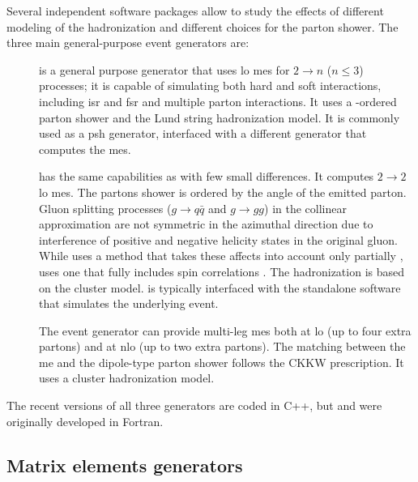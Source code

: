 Several independent software packages allow to study the effects of different modeling of the hadronization and different choices for the parton shower. The three main general-purpose event generators are:

\begin{description}
\item[\PY] \cite{Sjostrand:2006za,Sjostrand:2014zea} is a general purpose generator that uses \gls{lo} \glspl{me} for $2\rightarrow n $ ($n \leq 3$) processes; 
it is capable of simulating both hard and soft interactions, including \gls{isr} and \gls{fsr} and multiple parton interactions.
It uses a \pt-ordered parton shower and the Lund string hadronization model. It is commonly used as a \gls{psh} generator, interfaced with a different generator that computes the \glspl{me}.

\item[\HW] \cite{Corcella:2000bw,Bahr:2008pv,Bellm:2015jjp} has the same capabilities as \PY with few small differences. 
It computes $2\rightarrow 2$ \gls{lo} \glspl{me}.
 The partons shower is ordered by the angle of the emitted parton. Gluon splitting processes ($g \rightarrow q\bar{q}$ and $g \rightarrow gg$) in the collinear approximation are not symmetric in the azimuthal direction due to interference of positive and negative helicity states in the original gluon. 
While \PY uses a method that takes these affects into account only partially \cite{Webber:1987uy}, \HW uses one that fully includes spin correlations \cite{Collins:1987cp}. The hadronization is based on the cluster model.
\HW is typically interfaced with the standalone software \jimmy \cite{Butterworth:1996zw} that simulates the underlying event.

\item[\Sherpa] \cite{Gleisberg:2008ta} The \Sherpa event generator can provide multi-leg \glspl{me} both at \gls{lo} (up to four extra partons) and at \gls{nlo} (up to two extra partons). 
The matching between the \gls{me} and the dipole-type parton shower \cite{Schumann:2007mg} follows the CKKW prescription.
It uses a cluster hadronization model. 

\end{description}

The recent versions of all three generators are coded in C++, but \HW and \PY were originally developed in Fortran.  

\subsection{Matrix elements generators}


